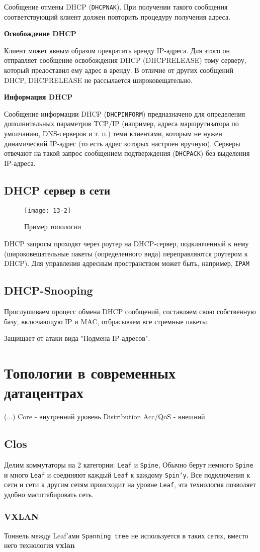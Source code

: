\documentclass[a4paper,10pt]{article}
\begin{document}
	Сообщение отмены DHCP (\texttt{DHCPNAK}). При получении такого сообщения соответствующий клиент должен повторить процедуру получения адреса.
	
	\textbf{Освобождение DHCP}
	
	Клиент может явным образом прекратить аренду IP-адреса. Для этого он отправляет сообщение освобождения DHCP (DHCPRELEASE) тому серверу, который предоставил ему адрес в аренду. В отличие от других сообщений DHCP, DHCPRELEASE не рассылается широковещательно.
	
	\textbf{Информация DHCP}
	
	Сообщение информации DHCP (\texttt{DHCPINFORM}) предназначено для определения дополнительных параметров TCP/IP (например, адреса маршрутизатора по умолчанию, DNS-серверов и т. п.) теми клиентами, которым не нужен динамический IP-адрес (то есть адрес которых настроен вручную). Серверы отвечают на такой запрос сообщением подтверждения (\texttt{DHCPACK}) без выделения IP-адреса. 
	
	\subsection{DHCP сервер в сети}
	
	\begin{figure}[h!]
		\centering
		\texttt{[image: 13-2]}
		\caption{Пример топологии}
	\end{figure}
	
	DHCP запросы проходят через роутер на DHCP-сервер, подключенный к нему (широковещательные пакеты (определенного вида) переправляются роутером к DHCP). Для управления адресным пространством может быть, например,  \texttt{IPAM}
	
	\subsection{DHCP-Snooping}
	Прослушиваем процесс обмена DHCP сообщений, составляем свою собственную базу, включающую IP и MAC, отбрасываем все стремные пакеты.
	
	Защищает от атаки вида "Подмена IP-адресов".
	
	\section{Топологии в современных датацентрах}
	(...)
	Core - внутренний уровень
	Distribution 
	Acc/QoS - внешний
	
	\subsection{Clos}
	Делим коммутаторы на 2 категории: \texttt{Leaf} и \texttt{Spine}, Обычно берут немного \texttt{Spine} и много \texttt{Leaf} и соединяют каждый \texttt{Leaf} к каждому \texttt{Spin'у}. Все подключения к сети и сети к другим сетям происходит на уровне \texttt{Leaf}, эта технология позволяет удобно масштабировать сеть.
	
	\subsubsection{VXLAN}
	Тоннель между Leaf'ами
	\texttt{Spanning tree} не используется в таких сетях, вместо него технология \textbf{vxlan}
\end{document}
